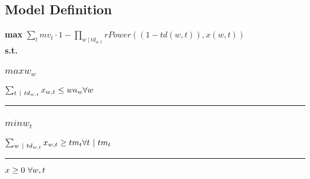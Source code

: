 \documentclass[11pt]{article}
\begin{document}
\subsection*{Model Definition}
\textbf{max} $\sum_{t} mv_{t} \cdot 1 - \prod_{w ~ | ~ td_{w,t}}  rPower((1 - td(w,t)),x(w,t)) $\\
\textbf{s.t.}
\subsubsection*{$maxw_{w}$}
$
\sum_{t ~ | ~ td_{w,t}} x_{w,t} \leq wa_{w}\hfill \forall w
$
\vspace{5pt}
\hrule
\subsubsection*{$minw_{t}$}
$
\sum_{w ~ | ~ td_{w,t}} x_{w,t} \geq tm_{t}\hfill \forall t ~ | ~ tm_{t}
$
\vspace{5pt}
\hrule
\bigskip
$x\geq 0 ~ \forall w,t\\$
\end{document}

